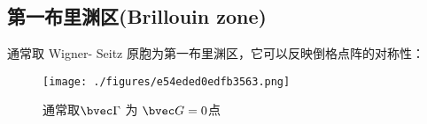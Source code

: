 
\begin{issues}
\issueDraft
\end{issues}

\subsection{第一布里渊区(Brillouin zone)}
通常取 Wigner- Seitz 原胞为第一布里渊区，它可以反映倒格点阵的对称性：
\begin{figure}[ht]
\centering
\texttt{[image: ./figures/e54eded0edfb3563.png]}
\caption{通常取$\bvec \Gamma$ 为 $\bvec G = 0$点} \label{fig_BriZon_1}
\end{figure}
